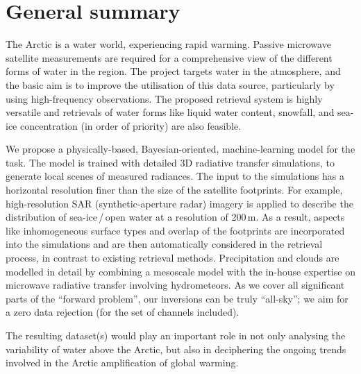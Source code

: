 \documentclass[12pt,oneside,a4paper]{article}
\begin{document}
	
	
	\thispagestyle{empty}
	\vspace*{-10mm}
	\noindent
	\textbf{\Large \LongTitle}




\section{General summary}
%
The Arctic is a water world, experiencing rapid warming. Passive microwave
satellite measurements are required for a comprehensive view of the different forms of water in the region. The project targets water in the atmosphere, and the basic aim is to improve the utilisation of this data source, particularly by using high-frequency observations. The proposed retrieval system is highly versatile and retrievals of water forms like liquid water content, snowfall, and sea-ice concentration (in order of priority) are also feasible.

We propose a physically-based, Bayesian-oriented, machine-learning model for
the task. The model is trained with detailed 3D radiative transfer simulations,
to generate local scenes of measured radiances. The input to the simulations
has a horizontal resolution finer than the size of the satellite footprints.
For example, high-resolution SAR (synthetic-aperture radar) imagery is applied
to describe the distribution of sea-ice\,/\,open water at a resolution of
200\,m. As a result, aspects like inhomogeneous surface types and overlap of
the footprints are incorporated into the simulations and are then automatically
considered in the retrieval process, in contrast to existing retrieval methods.
Precipitation and clouds are modelled in detail by combining a mesoscale model
with the in-house expertise on microwave radiative transfer involving
hydrometeors. As we cover all significant parts of the ``forward problem'', our
inversions can be truly ``all-sky''; we aim for a zero data rejection (for the
set of channels included).

The resulting dataset(s) would play an important role in not only analysing the
variability of water above the Arctic, but also in deciphering the
ongoing trends involved in the Arctic amplification of global warming.
\end{document}
